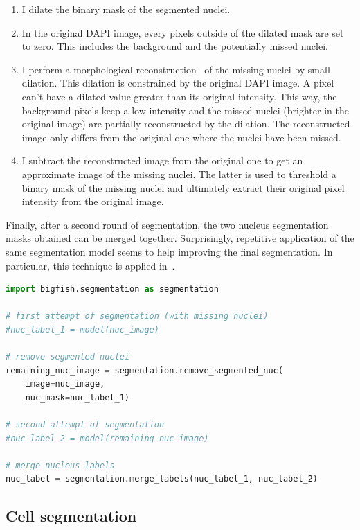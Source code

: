 \begin{enumerate}
	\setlength\itemsep{0.1em}
	\item I dilate the binary mask of the segmented nuclei.
	\item In the original DAPI image, every pixels outside of the dilated mask are set to zero.
	This includes the background and the potentially missed nuclei.
	\item I perform a morphological reconstruction~\cite{Robinson_2004} of the missing nuclei by small dilation.
	This dilation is constrained by the original DAPI image.
	A pixel can't have a dilated value greater than its original intensity.
	This way, the background pixels keep a low intensity and the missed nuclei (brighter in the original image) are partially reconstructed by the dilation.
	The reconstructed image only differs from the original one where the nuclei have been missed.
	\item I subtract the reconstructed image from the original one to get an approximate image of the missing nuclei.
	The latter is used to threshold a binary mask of the missing nuclei and ultimately extract their original pixel intensity from the original image.
\end{enumerate}

\noindent
Finally, after a second round of segmentation, the two nucleus segmentation masks obtained can be merged together.
Surprisingly, repetitive application of the same segmentation model seems to help improving the final segmentation.
In particular, this technique is applied in~\cite{CHOUAIB_2020}.\\

\begin{minipage}{0.9\textwidth}
\begin{lstlisting}[language=Python]
import bigfish.segmentation as segmentation

# first attempt of segmentation (with missing nuclei)
#nuc_label_1 = model(nuc_image)

# remove segmented nuclei
remaining_nuc_image = segmentation.remove_segmented_nuc(
	image=nuc_image,
	nuc_mask=nuc_label_1)

# second attempt of segmentation
#nuc_label_2 = model(remaining_nuc_image)

# merge nucleus labels
nuc_label = segmentation.merge_labels(nuc_label_1, nuc_label_2)
\end{lstlisting}
\end{minipage}

\subsection{Cell segmentation}
\label{subsec:segmentation_cell}

